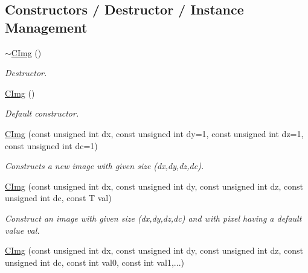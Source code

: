 \subsection*{Constructors / Destructor / Instance Management}
\label{_amgrp40aea8b807100c67fa0d7b630c9c7060}
 \begin{DoxyCompactItemize}
\item 
\hyperlink{structcimg__library_1_1CImg_ad71c294580a5307aa31246e4a1ee7866}{$\sim$CImg} ()
\begin{DoxyCompactList}\small\item\em Destructor. \item\end{DoxyCompactList}\item 
\hyperlink{structcimg__library_1_1CImg_a8a31842596268c9fc95810890607762f}{CImg} ()
\begin{DoxyCompactList}\small\item\em Default constructor. \item\end{DoxyCompactList}\item 
\hyperlink{structcimg__library_1_1CImg_a533dbb08f7b230fbc4c89d69cf6bc20a}{CImg} (const unsigned int dx, const unsigned int dy=1, const unsigned int dz=1, const unsigned int dc=1)
\begin{DoxyCompactList}\small\item\em Constructs a new image with given size ({\ttfamily dx},{\ttfamily dy},{\ttfamily dz},{\ttfamily dc}). \item\end{DoxyCompactList}\item 
\hyperlink{structcimg__library_1_1CImg_a456dc7452f9e0a0c820c469bb7ad2e2c}{CImg} (const unsigned int dx, const unsigned int dy, const unsigned int dz, const unsigned int dc, const T val)
\begin{DoxyCompactList}\small\item\em Construct an image with given size ({\ttfamily dx},{\ttfamily dy},{\ttfamily dz},{\ttfamily dc}) and with pixel having a default value {\ttfamily val}. \item\end{DoxyCompactList}\item 
\hypertarget{structcimg__library_1_1CImg_a8548f5e92466a14f22ef42e212392624}{
\hyperlink{structcimg__library_1_1CImg_a8548f5e92466a14f22ef42e212392624}{CImg} (const unsigned int dx, const unsigned int dy, const unsigned int dz, const unsigned int dc, const int val0, const int val1,...)}
\label{structcimg__library_1_1CImg_a8548f5e92466a14f22ef42e212392624}


\end{DoxyCompactItemize}
